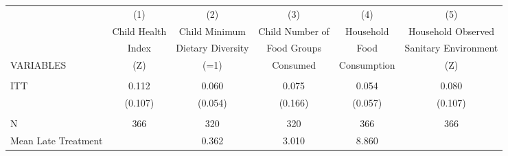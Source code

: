 \begin{tabular}{lccccc} \hline
 & (1) & (2) & (3) & (4) & (5) \\
 & Child Health & Child Minimum & Child Number of & Household & Household Observed \\
 & Index & Dietary Diversity & Food Groups & Food & Sanitary Environment \\
VARIABLES & (Z) & (=1) & Consumed & Consumption & (Z) \\ \hline
 &  &  &  &  &  \\
ITT & 0.112 & 0.060 & 0.075 & 0.054 & 0.080 \\
 & (0.107) & (0.054) & (0.166) & (0.057) & (0.107) \\
 &  &  &  &  &  \\
N & 366 & 320 & 320 & 366 & 366 \\
 Mean Late Treatment &  & 0.362 & 3.010 & 8.860 &  \\ \hline
\end{tabular}
